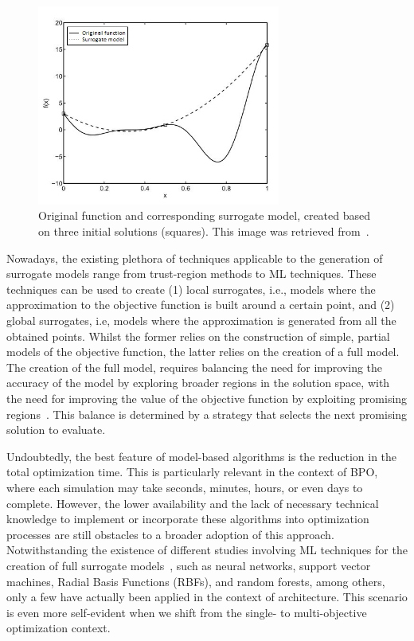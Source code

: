 	\begin{figure}
		\centering
		\includegraphics[width=8cm]{Images/Background/sbosexample.JPG}
		\caption[Example of a surrogate model]{Original function and corresponding surrogate model, created based on three initial solutions (squares). This image was retrieved from~\cite{Koziel2011}.}
		\label{fig:sbosexample}
	\end{figure}
	
	Nowadays, the existing plethora of techniques applicable to the generation of surrogate models range from trust-region methods to \ac{ML} techniques. These techniques can be used to create (1) local surrogates, i.e., models where the approximation to the objective function is built around a certain point, and (2) global surrogates, i.e, models where the approximation is generated from all the obtained points. Whilst the former relies on the construction of simple, partial models of the objective function, the latter relies on the creation of a full model. The creation of the full model, requires balancing the need for improving the accuracy of the model by exploring broader regions in the solution space, with the need for improving the value of the objective function by exploiting promising regions~\cite{Koziel2011}. This balance is determined by a strategy that selects the next promising solution to evaluate.
	
	Undoubtedly, the best feature of model-based algorithms is the reduction in the total optimization time. This is particularly relevant in the context of \ac{BPO}, where each simulation may take seconds, minutes, hours, or even days to complete. However, the lower availability and the lack of necessary technical knowledge to implement or incorporate these algorithms into optimization processes are still obstacles to a broader adoption of this approach. Notwithstanding the existence of different studies involving \ac{ML} techniques for the creation of full surrogate models~\cite{Koziel2011, Forrester2009SBO}, such as neural networks, support vector machines, Radial Basis Functions (RBFs), and random forests, among others, only a few have actually been applied in the context of architecture. This scenario is even more self-evident when we shift from the single- to multi-objective optimization context.
	
